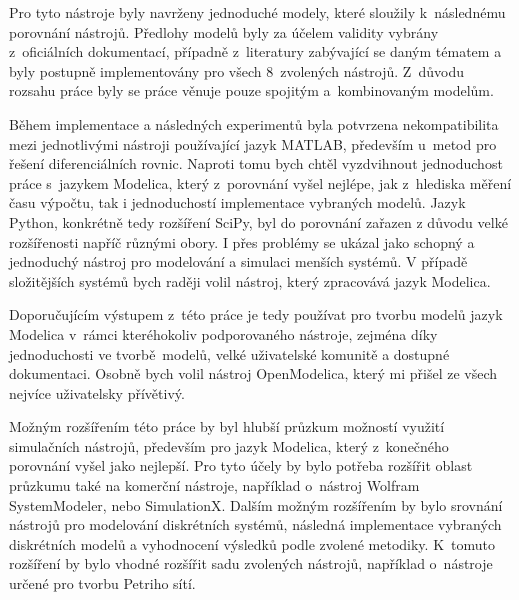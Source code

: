 Pro tyto nástroje byly navrženy jednoduché modely, které sloužily k~následnému porovnání nástrojů. Předlohy modelů byly za účelem validity vybrány z~oficiálních dokumentací, případně z~literatury zabývající se daným tématem a byly postupně implementovány pro všech 8~zvolených nástrojů. Z~důvodu rozsahu práce byly se práce věnuje pouze spojitým a~kombinovaným modelům.

Během implementace a následných experimentů byla potvrzena nekompatibilita mezi jednotlivými nástroji používající jazyk MATLAB, především u~metod pro řešení diferenciálních rovnic. Naproti tomu bych chtěl vyzdvihnout jednoduchost práce s~jazykem Modelica, který z~porovnání vyšel nejlépe, jak z~hlediska měření času výpočtu, tak i jednoduchostí implementace vybraných modelů. Jazyk Python, konkrétně tedy rozšíření SciPy, byl do porovnání zařazen z důvodu velké rozšířenosti napříč různými obory. I přes problémy se ukázal jako schopný a jednoduchý nástroj pro modelování a simulaci menších systémů. V případě složitějších systémů bych raději volil nástroj, který zpracovává jazyk Modelica.

Doporučujícím výstupem z~této práce je tedy používat pro tvorbu modelů jazyk Modelica v~rámci kteréhokoliv podporovaného nástroje, zejména díky jednoduchosti ve tvorbě~modelů, velké uživatelské komunitě a dostupné dokumentaci. Osobně bych volil nástroj OpenModelica, který mi přišel ze všech nejvíce uživatelsky přívětivý.

Možným rozšířením této práce by byl hlubší průzkum možností využití simulačních nástrojů, především pro jazyk Modelica, který z~konečného porovnání vyšel jako nejlepší. Pro tyto účely by bylo potřeba rozšířit oblast průzkumu také na komerční nástroje, například o~nástroj Wolfram SystemModeler, nebo SimulationX. Dalším možným rozšířením by bylo srovnání nástrojů pro modelování diskrétních systémů, následná implementace vybraných diskrétních modelů a vyhodnocení výsledků podle zvolené metodiky. K~tomuto rozšíření by bylo vhodné rozšířit sadu zvolených nástrojů, například o~nástroje určené pro tvorbu Petriho sítí.

